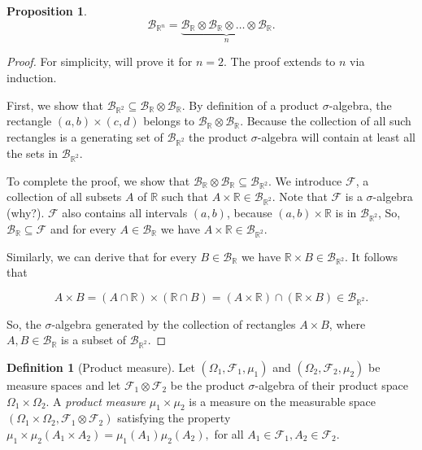 \documentclass{book}
\theoremstyle{plain}%
\newtheorem{proposition}{Proposition}[section]
\theoremstyle{definition}
\newtheorem{definition}{Definition}[section]
\begin{document}
\begin{proposition}
$$\mathcal{B}_{\mathbb{R}^n} = \underbrace{\mathcal{B}_\mathbb{R} \otimes \mathcal{B}_\mathbb{R} \otimes \hdots \otimes \mathcal{B}_\mathbb{R}}_n.$$
\end{proposition}

\begin{proof}
For simplicity, will prove it for $n = 2$. The proof extends to $n$ via induction.

First, we show that $\mathcal{B}_{\mathbb{R}^2} \subseteq \mathcal{B}_\mathbb{R} \otimes \mathcal{B}_\mathbb{R}$. By definition of a product $\sigma$-algebra, the rectangle $(a,b) \times (c, d)$ belongs to $\mathcal{B}_\mathbb{R} \otimes \mathcal{B}_\mathbb{R}$. Because the collection of all such rectangles is a generating set of $\mathcal{B}_{\mathbb{R}^2}$ the product $\sigma$-algebra will contain at least all the sets in $\mathcal{B}_{\mathbb{R}^2}$.

To complete the proof, we show that $\mathcal{B}_\mathbb{R} \otimes \mathcal{B}_\mathbb{R} \subseteq \mathcal{B}_{\mathbb{R}^2}$. We introduce $\mathcal{F}$, a collection of all subsets $A$ of $\mathbb{R}$ such that $A \times \mathbb{R} \in \mathcal{B}_{\mathbb{R}^2}$. Note that $\mathcal{F}$ is a $\sigma$-algebra (why?). $\mathcal{F}$ also contains all intervals $(a, b)$, because $(a, b) \times \mathbb{R}$ is in $\mathcal{B}_{\mathbb{R}^2}$, So, $\mathcal{B}_\mathbb{R} \subseteq \mathcal{F}$ and for every $A \in \mathcal{B}_\mathbb{R}$ we have $A \times \mathbb{R} \in \mathcal{B}_{\mathbb{R}^2}$.

Similarly, we can derive that for every $B \in \mathcal{B}_\mathbb{R}$ we have $\mathbb{R}  \times B\in \mathcal{B}_{\mathbb{R}^2}$. It follows that 

$$A \times B = (A \cap \mathbb{R}) \times (\mathbb{R} \cap B) = (A \times \mathbb{R}) \cap (\mathbb{R} \times B) \in \mathcal{B}_{\mathbb{R}^2}.$$

So, the $\sigma$-algebra generated by the collection of rectangles $A \times B$, where $A, B \in \mathcal{B}_\mathbb{R}$ is a subset of $\mathcal{B}_{\mathbb{R}^2}$.
\end{proof}

\begin{definition}[Product measure] Let $(\Omega_1, \mathcal{F}_1, \mu_1)$ and $(\Omega_2, \mathcal{F}_2, \mu_2)$ be measure spaces and let $\mathcal{F}_1 \otimes \mathcal{F}_2$ be the product $\sigma$-algebra of their product space $\Omega_1 \times \Omega_2$. A \emph{product measure} $\mu_1 \times \mu_2$ is a measure on the measurable space $(\Omega_1 \times \Omega_2, \mathcal{F}_1 \otimes \mathcal{F}_2)$ satisfying the property $\mu_1 \times \mu_2(A_1 \times A_2) = \mu_1(A_1)\mu_2(A_2),$ for all $A_1 \in \mathcal{F}_1, A_2 \in \mathcal{F}_2$.
\end{definition}
\end{document}

